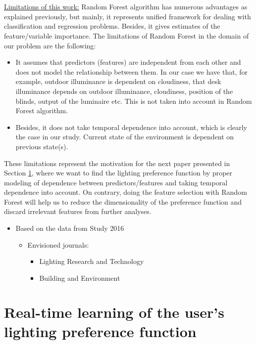 \documentclass[a4paper]{article}
\begin{document}
\\\\
\underline{Limitations of this work:} Random Forest algorithm has numerous advantages as explained previously, but mainly, it represents unified framework for dealing with classification and regression problems. Besides, it gives estimates of the feature/variable importance. The limitations of Random Forest in the domain of our problem are the following:
\begin{itemize}
\item It assumes that predictors (features) are independent from each other and does not model the relationship between them. In our case we have that, for example, outdoor illuminance is dependent on cloudiness, that desk illuminance depends on outdoor illuminance, cloudiness, position of the blinds, output of the luminaire etc. This is not taken into account in Random Forest algorithm.
\item Besides, it does not take temporal dependence into account, which is clearly the case in our study. Current state of the environment is dependent on previous state(s).
\end{itemize}

These limitations represent the motivation for the next paper presented in Section \ref{sec:ReinforcementLearning}, where we want to find the lighting preference function by proper modeling of dependence between predictors/features and taking temporal dependence into account. 
On contrary, doing the feature selection with Random Forest  will help us to reduce the dimensionality of the preference function and discard irrelevant features from further analyses.

\begin{itemize}
	\item{Based on the data from Study 2016}
	\begin{itemize}
		\item Envisioned journals:
			\begin{itemize}
				\color{blue}
				\item Lighting Research and Technology
				\item Building and Environment
			\end{itemize}
	\end{itemize}
\end{itemize}


\section{Real-time learning of the user's lighting preference function}\label{sec:ReinforcementLearning}
\end{document}
